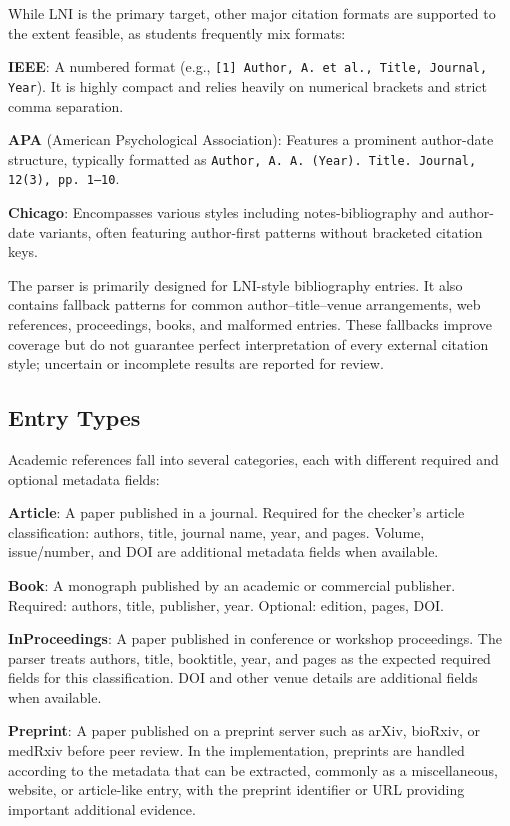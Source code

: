 \documentclass[12pt,a4paper,oneside]{report}
\begin{document}
While LNI is the primary target, other major citation formats are supported to the extent feasible, as students frequently mix formats:


\textbf{IEEE}: A numbered format (e.g., \texttt{[1] Author, A. et al., Title, Journal, Year}). It is highly compact and relies heavily on numerical brackets and strict comma separation.

\textbf{APA} (American Psychological Association): Features a prominent author-date structure, typically formatted as \texttt{Author, A. A. (Year). Title. Journal, 12(3), pp. 1--10}. 

\textbf{Chicago}: Encompasses various styles including notes-bibliography and author-date variants, often featuring author-first patterns without bracketed citation keys.

The parser is primarily designed for LNI-style bibliography entries. It also contains fallback patterns for common author--title--venue arrangements, web references, proceedings, books, and malformed entries. These fallbacks improve coverage but do not guarantee perfect interpretation of every external citation style; uncertain or incomplete results are reported for review.

\subsection{Entry Types}

Academic references fall into several categories, each with different required and optional metadata fields:

\textbf{Article}: A paper published in a journal. Required for the checker's article classification: authors, title, journal name, year, and pages. Volume, issue/number, and DOI are additional metadata fields when available.

\textbf{Book}: A monograph published by an academic or commercial publisher. Required: authors, title, publisher, year. Optional: edition, pages, DOI.

\textbf{InProceedings}: A paper published in conference or workshop proceedings. The parser treats authors, title, booktitle, year, and pages as the expected required fields for this classification. DOI and other venue details are additional fields when available.

\textbf{Preprint}: A paper published on a preprint server such as arXiv, bioRxiv, or medRxiv before peer review. In the implementation, preprints are handled according to the metadata that can be extracted, commonly as a miscellaneous, website, or article-like entry, with the preprint identifier or URL providing important additional evidence.
\end{document}
